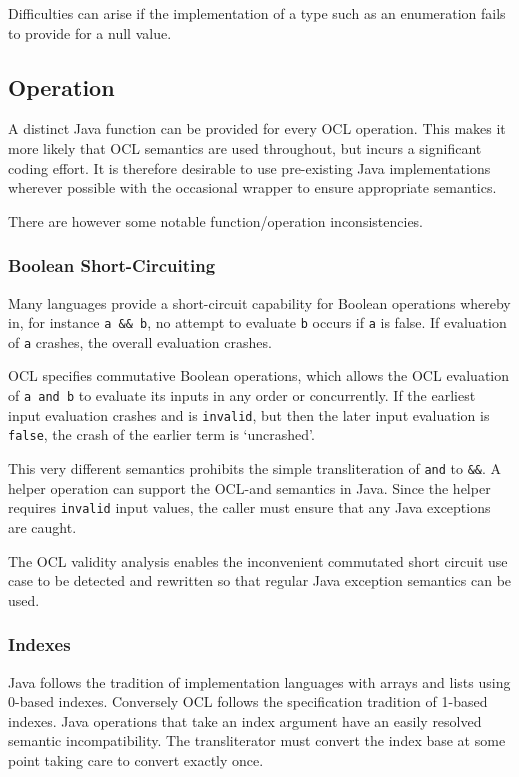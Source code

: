 \documentclass[sigconf]{acmart}
\begin{document}
Difficulties can arise if the implementation of a type such as an enumeration fails to provide for a null value.

\subsection{Operation}

A distinct Java function can be provided for every OCL operation. This makes it more likely that OCL semantics are used throughout, but incurs a significant coding effort. It is therefore desirable to use pre-existing Java implementations wherever possible with the occasional wrapper to ensure appropriate semantics.

There are however some notable function/operation inconsistencies.

\subsubsection{Boolean Short-Circuiting}

Many languages provide a short-circuit capability for Boolean operations whereby in, for instance \verb|a && b|, no attempt to evaluate \texttt{b} occurs if \texttt{a} is false. If evaluation of \texttt{a} crashes, the overall evaluation crashes.

OCL specifies commutative Boolean operations, which allows the OCL evaluation of \verb|a and b| to evaluate its inputs in any order or concurrently. If the earliest input evaluation crashes and is \texttt{invalid}, but then the later input evaluation is \texttt{false}, the crash of the earlier term is `uncrashed'.

This very different semantics prohibits the simple transliteration of \texttt{and} to \texttt{\&\&}. A helper operation can support the OCL-and semantics in Java. Since the helper requires \texttt{invalid} input values, the caller must ensure that any Java exceptions are caught.

The OCL validity analysis \cite{Willink2021} enables the inconvenient commutated short circuit use case to be detected and rewritten so that regular Java exception semantics can be used.

\subsubsection{Indexes}

Java follows the tradition of implementation languages with arrays and lists using 0-based indexes. Conversely OCL follows the specification tradition of 1-based indexes. Java operations that take an index argument have an easily resolved semantic incompatibility.
The transliterator must convert the index base at some point taking care to convert exactly once.
\end{document}

